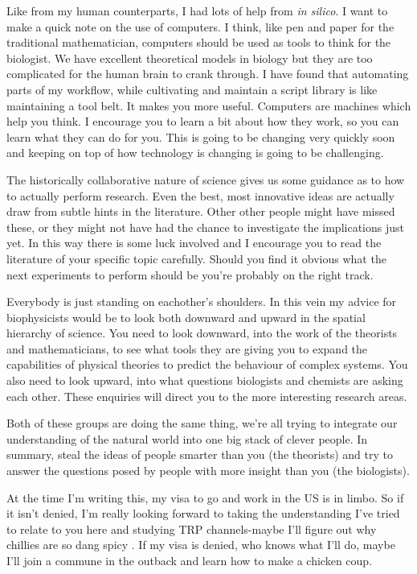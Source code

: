 Like from my human counterparts, I had lots of help from \textit{in silico}.  I want to make a quick note on the use of computers. I think, like pen and paper for the traditional mathematician, computers should be used as tools to think for the biologist. We have excellent theoretical models in biology but they are too complicated for the human brain to crank through. I have found that automating parts of my workflow, while cultivating and maintain a script library is like maintaining a tool belt. It makes you more useful. Computers are machines which help you think. I encourage you to learn a bit about how they work, so you can learn what they can do for you. This is going to be changing very quickly soon and keeping on top of how technology is changing is going to be challenging. 

The historically collaborative nature of science gives us some guidance as to how to actually perform research. Even the best, most innovative ideas are actually draw from subtle hints in the literature. Other other people might have missed these, or they might not have had the chance to investigate the implications just yet. In this way there is some luck involved and I encourage you to read the literature of your specific topic carefully. Should you find it obvious what the next experiments to perform should be you're probably on the right track.

Everybody is just standing on eachother's shoulders. In this vein my advice for biophysicists would be to look both downward and upward in the spatial hierarchy of science. You need to look downward, into the work of the theorists and mathematicians, to see what tools they are giving you to expand the capabilities of physical theories to predict the behaviour of complex systems. You also need to look upward, into what questions biologists and chemists are asking each other. These enquiries will direct you to the more interesting research areas. 

Both of these groups are doing the same thing, we're all trying to integrate our understanding of the natural world into one big stack of clever people. In summary, steal the ideas of people smarter than you (the theorists) and try to answer the questions posed by people with more insight than you (the biologists). 

At the time I'm writing this, my visa to go and work in the US is in limbo. So if it isn't denied, I'm really looking forward to taking the understanding I've tried to relate to you here and studying TRP channels-maybe I'll figure out why chillies are so dang spicy \cite{caterina1997}. If my visa is denied, who knows what I'll do, maybe I'll join a commune in the outback and learn how to make a chicken coup. 

